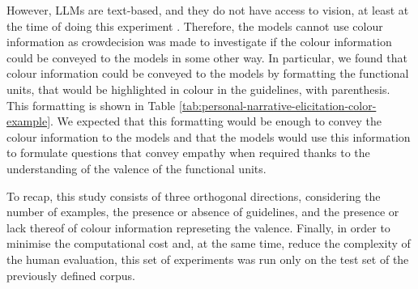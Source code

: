 
However, LLMs are text-based, and they do not have access to vision, at least at the time of doing this experiment \cite{chatgpt-see}. Therefore, the models cannot use colour information as crowdecision was made to investigate if the colour information could be conveyed to the models in some other way. In particular, we found that colour information could be conveyed to the models by formatting the functional units, that would be highlighted in colour in the guidelines, with parenthesis. This formatting is shown in Table \ref{tab:personal-narrative-elicitation-color-example}. We expected that this formatting would be enough to convey the colour information to the models and that the models would use this information to formulate questions that convey empathy when required thanks to the understanding of the valence of the functional units. 

% 
To recap, this study consists of three orthogonal directions, considering the number of examples, the presence or absence of guidelines, and the presence or lack thereof of colour information represeting the valence. 
Finally, in order to minimise the computational cost and, at the same time, reduce the complexity of the human evaluation, this set of experiments was run only on the test set of the previously defined corpus. 
